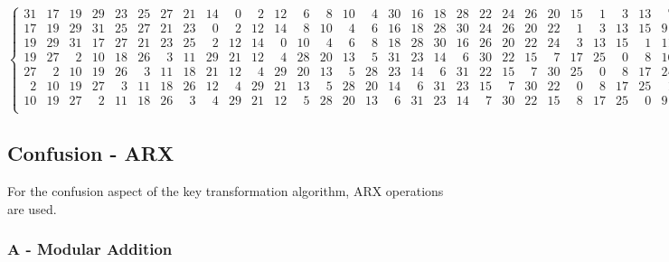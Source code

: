 \documentclass[fleqn, a4paper,12pt]{article}
\begin{document}
\[\begin{Bmatrix}
31 & 17 & 19 & 29 & 23 & 25 & 27 & 21 & 14 & \phantom{0}0 & \phantom{0}2 & 12 & \phantom{0}6 & \phantom{0}8 & 10 & \phantom{0}4 & 30 & 16 & 18 & 28 & 22 & 24 & 26 & 20 & 15 & \phantom{0}1 & \phantom{0}3 & 13 & \phantom{0}7 & 9 & 11 & \phantom{0}5 \\
17 & 19 & 29 & 31 & 25 & 27 & 21 & 23 & \phantom{0}0 & \phantom{0}2 & 12 & 14 & \phantom{0}8 & 10 & \phantom{0}4 & \phantom{0}6 & 16 & 18 & 28 & 30 & 24 & 26 & 20 & 22 & \phantom{0}1 & \phantom{0}3 & 13 & 15 & 9 & 11 & \phantom{0}5 & \phantom{0}7 \\
19 & 29 & 31 & 17 & 27 & 21 & 23 & 25 & \phantom{0}2 & 12 & 14 & \phantom{0}0 & 10 & \phantom{0}4 & \phantom{0}6 & \phantom{0}8 & 18 & 28 & 30 & 16 & 26 & 20 & 22 & 24 & \phantom{0}3 & 13 & 15 & \phantom{0}1 & 11 & \phantom{0}5 & \phantom{0}7 & 9 \\
19 & 27 & \phantom{0}2 & 10 & 18 & 26 & \phantom{0}3 & 11 & 29 & 21 & 12 & \phantom{0}4 & 28 & 20 & 13 & \phantom{0}5 & 31 & 23 & 14 & \phantom{0}6 & 30 & 22 & 15 & \phantom{0}7 & 17 & 25 & \phantom{0}0 & \phantom{0}8 & 16 & 24 & \phantom{0}1 & 9 \\
27 & \phantom{0}2 & 10 & 19 & 26 & \phantom{0}3 & 11 & 18 & 21 & 12 & \phantom{0}4 & 29 & 20 & 13 & \phantom{0}5 & 28 & 23 & 14 & \phantom{0}6 & 31 & 22 & 15 & \phantom{0}7 & 30 & 25 & \phantom{0}0 & \phantom{0}8 & 17 & 24 & \phantom{0}1 & 9 & 16 \\
\phantom{0}2 & 10 & 19 & 27 & \phantom{0}3 & 11 & 18 & 26 & 12 & \phantom{0}4 & 29 & 21 & 13 & \phantom{0}5 & 28 & 20 & 14 & \phantom{0}6 & 31 & 23 & 15 & \phantom{0}7 & 30 & 22 & \phantom{0}0 & \phantom{0}8 & 17 & 25 & \phantom{0}1 & 9 & 16 & 24 \\
10 & 19 & 27 & \phantom{0}2 & 11 & 18 & 26 & \phantom{0}3 & \phantom{0}4 & 29 & 21 & 12 & \phantom{0}5 & 28 & 20 & 13 & \phantom{0}6 & 31 & 23 & 14 & \phantom{0}7 & 30 & 22 & 15 & \phantom{0}8 & 17 & 25 & \phantom{0}0 & 9 & 16 & 24 & \phantom{0}1 \\
\end{Bmatrix}
\]

\subsection{Confusion - ARX}

For the confusion aspect of the key transformation algorithm, ARX operations are used.

\subsubsection{A - Modular Addition} %
\end{document}
